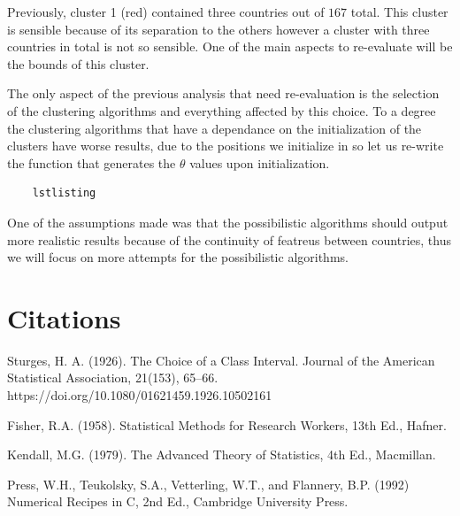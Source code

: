 \documentclass[12pt, a4paper]{article}
\begin{document}
Previously, cluster 1 (red) contained three countries out of $167$ total. This cluster is sensible because of its separation to the others however a cluster with three countries in total is not so sensible. One of the main aspects to re-evaluate will be the bounds of this cluster.
\newline

The only aspect of the previous analysis that need re-evaluation is the selection of the clustering algorithms and everything affected by this choice. To a degree the clustering algorithms that have a dependance on the initialization of the clusters have worse results, due to the positions we initialize in so let us re-write the function that generates the $\theta$ values upon initialization.

\begin{lstlisting}
    lstlisting
\end{lstlisting}

One of the assumptions made was that the possibilistic algorithms should output more realistic results because of the continuity of featreus between countries, thus we will focus on more attempts for the possibilistic algorithms.

\section{Citations}

Sturges, H. A. (1926). The Choice of a Class Interval. Journal of the American Statistical Association, 21(153), 65–66. https://doi.org/10.1080/01621459.1926.10502161
\newline

Fisher, R.A. (1958). Statistical Methods for Research Workers, 13th Ed., Hafner. 
\newline

Kendall, M.G. (1979). The Advanced Theory of Statistics, 4th Ed., Macmillan.
\newline

Press, W.H., Teukolsky, S.A., Vetterling, W.T., and Flannery, B.P. (1992) Numerical Recipes in C, 2nd Ed., Cambridge University Press.
\end{document}
